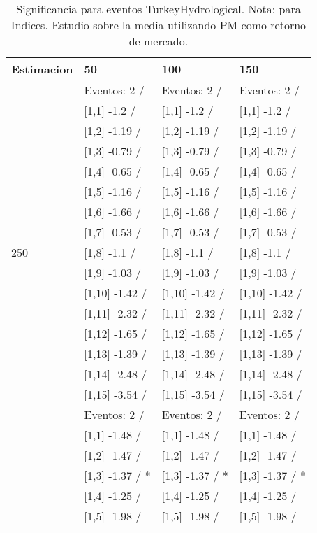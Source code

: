 \begin{table}

\caption{Significancia para eventos TurkeyHydrological. Nota: para Indices. Estudio sobre la media utilizando PM como retorno de mercado.}
\centering
\begin{tabular}[t]{llll}
\toprule
Estimacion & 50 & 100 & 150\\
\midrule
 & Eventos:  2 / & Eventos:  2 / & Eventos:  2 /\\
 & {}[1,1] -1.2  / & {}[1,1] -1.2  / & {}[1,1] -1.2  /\\
 & {}[1,2] -1.19  / & {}[1,2] -1.19  / & {}[1,2] -1.19  /\\
 & {}[1,3] -0.79  / & {}[1,3] -0.79  / & {}[1,3] -0.79  /\\
 & {}[1,4] -0.65  / & {}[1,4] -0.65  / & {}[1,4] -0.65  /\\
\addlinespace
 & {}[1,5] -1.16  / & {}[1,5] -1.16  / & {}[1,5] -1.16  /\\
 & {}[1,6] -1.66  / & {}[1,6] -1.66  / & {}[1,6] -1.66  /\\
 & {}[1,7] -0.53  / & {}[1,7] -0.53  / & {}[1,7] -0.53  /\\
250 & {}[1,8] -1.1  / & {}[1,8] -1.1  / & {}[1,8] -1.1  /\\
 & {}[1,9] -1.03  / & {}[1,9] -1.03  / & {}[1,9] -1.03  /\\
\addlinespace
 & {}[1,10] -1.42  / & {}[1,10] -1.42  / & {}[1,10] -1.42  /\\
 & {}[1,11] -2.32  / & {}[1,11] -2.32  / & {}[1,11] -2.32  /\\
 & {}[1,12] -1.65  / & {}[1,12] -1.65  / & {}[1,12] -1.65  /\\
 & {}[1,13] -1.39  / & {}[1,13] -1.39  / & {}[1,13] -1.39  /\\
 & {}[1,14] -2.48  / & {}[1,14] -2.48  / & {}[1,14] -2.48  /\\
\addlinespace
 & {}[1,15] -3.54  / & {}[1,15] -3.54  / & {}[1,15] -3.54  /\\
 & Eventos:  2 / & Eventos:  2 / & Eventos:  2 /\\
 & {}[1,1] -1.48  / & {}[1,1] -1.48  / & {}[1,1] -1.48  /\\
 & {}[1,2] -1.47  / & {}[1,2] -1.47  / & {}[1,2] -1.47  /\\
 & {}[1,3] -1.37  / * & {}[1,3] -1.37  / * & {}[1,3] -1.37  / *\\
\addlinespace
 & {}[1,4] -1.25  / & {}[1,4] -1.25  / & {}[1,4] -1.25  /\\
 & {}[1,5] -1.98  / & {}[1,5] -1.98  / & {}[1,5] -1.98  /\\

\end{tabular}
\end{table}
